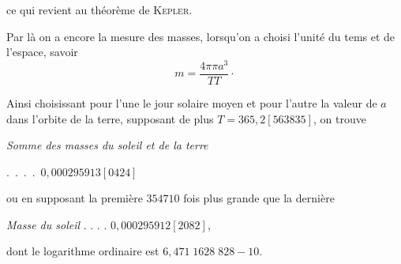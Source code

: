 ce qui revient au théorème de \textsc{Kepler}.
\par Par là on a encore la mesure des masses, lorsqu’on a choisi l’unité du tems et de l’espace, savoir
\[
m=\frac{4\pi\pi a^3}{TT}\mathpunct{\cdot}
\]
\par Ainsi choisissant pour l’une le jour solaire moyen et pour l’autre la valeur de \(a\) dans l’orbite de la terre, supposant de plus \(T=365{,}2[563835]\), on trouve
\begin{center}
\textit{Somme des masses du soleil et de la terre}\par\nobreak
\mbox{. . . . \(0{,}000295913[0424]\)}
\end{center}
ou en supposant la première \(354710\) fois plus grande que la dernière
\begin{center}
\textit{Masse du soleil} . . . . \(0{,}000295912[2082]\),
\end{center}
dont le logarithme ordinaire est \(6{,}471\;1628\;828-10\).
